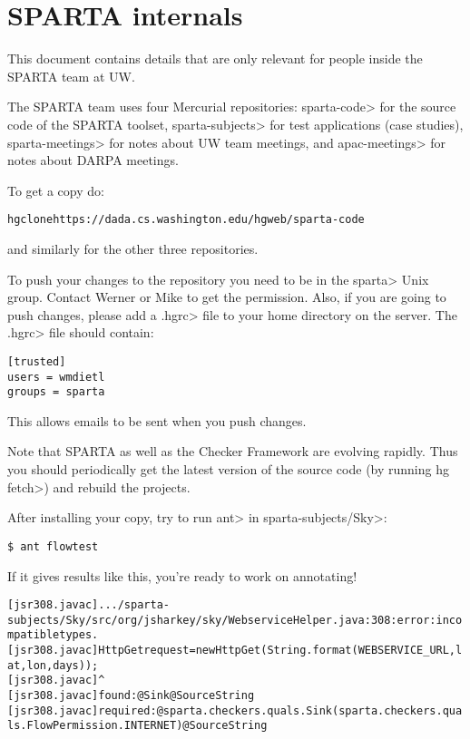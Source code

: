 \htmlhr
\chapter{SPARTA internals\label{sparta-internals}}

This document contains details that are only relevant for
people inside the SPARTA team at UW.

The SPARTA team uses four Mercurial repositories:
\<sparta-code> for the source code of the SPARTA toolset,
\<sparta-subjects> for test applications (case studies),
\<sparta-meetings> for notes about UW team meetings, and
\<apac-meetings> for notes about DARPA meetings.

To get a copy do:

\begin{alltt}
hg clone https://dada.cs.washington.edu/hgweb/sparta-code
\end{alltt}

\noindent
and similarly for the other three repositories.

To push your changes to the repository you need to be in the \<sparta> Unix
group. Contact Werner or Mike to get the permission.  Also, if you are
going to push changes, please add a \<.hgrc> file to your home directory on
the server.  The \<.hgrc> file should contain:

\begin{verbatim} 
[trusted]
users = wmdietl
groups = sparta
\end{verbatim}

This allows emails to be sent when you push changes. 

Note that SPARTA as well as the Checker Framework are evolving
rapidly.
Thus you should periodically get the latest version of the source code (by
running \<hg fetch>) and
rebuild the projects.


After installing your copy, try to run \<ant> in \<sparta-subjects/Sky>:

\begin{Verbatim}
$ ant flowtest
\end{Verbatim}

If it gives results like this, you're ready to work on annotating!

\begin{smaller}
\begin{alltt}
[jsr308.javac] .../sparta-subjects/Sky/src/org/jsharkey/sky/WebserviceHelper.java:308: error: incompatible types.
[jsr308.javac]             HttpGet request = new HttpGet(String.format(WEBSERVICE_URL, lat, lon, days));
[jsr308.javac]                                                        ^
[jsr308.javac]   found   : @Sink @Source String
[jsr308.javac]   required: @sparta.checkers.quals.Sink({sparta.checkers.quals.FlowPermission.INTERNET}) @Source String
\end{alltt}
\end{smaller}

